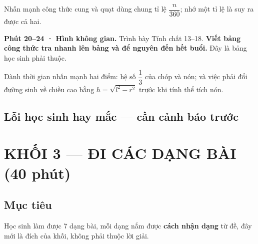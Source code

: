 \documentclass[11pt, a4paper]{article}
\begin{document}
Nhấn mạnh công thức cung và quạt dùng chung tỉ lệ $\dfrac{n}{360}$; nhớ một tỉ lệ là suy ra được cả hai.

\textbf{Phút 20–24 · Hình không gian.} Trình bày Tính chất 13–18. \textbf{Viết bảng công thức tra nhanh lên bảng và để nguyên đến hết buổi.} Đây là bảng học sinh phải thuộc.

Dành thời gian nhấn mạnh hai điểm: hệ số $\dfrac{1}{3}$ của chóp và nón; và việc phải đổi đường sinh về chiều cao bằng $h = \sqrt{l^2-r^2}$ trước khi tính thể tích nón.

\subsection{Lỗi học sinh hay mắc — cần cảnh báo trước}


\section{KHỐI 3 — ĐI CÁC DẠNG BÀI (40 phút)}

\subsection{Mục tiêu}

Học sinh làm được 7 dạng bài, mỗi dạng nắm được \textbf{cách nhận dạng} từ đề, đây mới là đích của khối, không phải thuộc lời giải.
\end{document}
